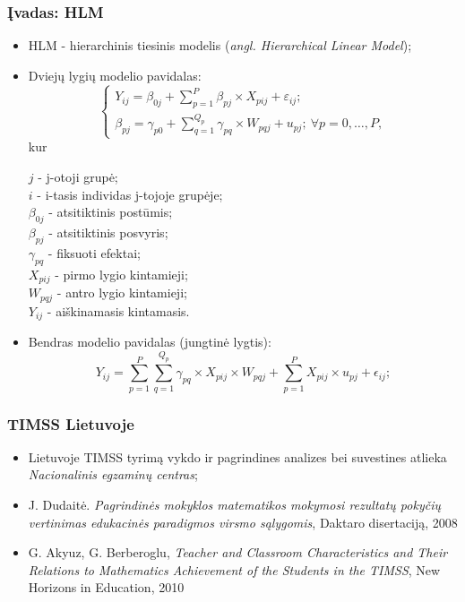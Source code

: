 \documentclass[utf8,hyperref={unicode,pdftex}]{beamer}
\begin{document}
\begin{frame}
\frametitle{Įvadas: HLM}
\begin{itemize}
\item HLM - hierarchinis tiesinis modelis (\textit{angl. Hierarchical Linear Model});
\item Dviejų lygių modelio pavidalas: 
\[ \left\{
  \begin{array}{l}
    Y_{ij} = \beta_{0j}+\sum^P_{p = 1} \beta_{pj}\times X_{pij}+\varepsilon_{ij}; \\
    \beta_{pj} = \gamma_{p0} + \sum^{Q_p}_{q=1}\gamma_{pq}\times W_{pqj}+u_{pj};\ \forall p = 0 , \dots, P,
  \end{array} \right.\]
kur\\
\begin{small}
$j$ - j-otoji grupė;\\
$i$ - i-tasis individas j-tojoje grupėje;\\
$\beta_{0j}$ - atsitiktinis postūmis;\\
$\beta_{pj}$ - atsitiktinis posvyris;\\
$\gamma_{pq}$ - fiksuoti efektai;\\
$X_{pij}$ - pirmo lygio kintamieji;\\
$W_{pqj}$ - antro lygio kintamieji;\\
$Y_{ij}$ - aiškinamasis kintamasis.
\end{small}
\small
\item Bendras modelio pavidalas (jungtinė lygtis):
\[ 
    Y_{ij} =\sum^P_{p = 1} \sum^{Q_p}_{q=1}\gamma_{pq}\times X_{pij}\times W_{pqj}+\sum^P_{p = 1} X_{pij}\times u_{pj}+\epsilon_{ij}; 
 \]
\end{itemize}
\end{frame}

\begin{frame}
\frametitle{TIMSS Lietuvoje}
\begin{itemize}
\item Lietuvoje TIMSS tyrimą vykdo ir pagrindines analizes bei suvestines atlieka \textit{Nacionalinis egzaminų centras};
\item J. Dudaitė. \textit{Pagrindinės mokyklos matematikos mokymosi rezultatų pokyčių vertinimas edukacinės paradigmos virsmo sąlygomis}, Daktaro disertaciją, 2008
\item G. Akyuz, G. Berberoglu, \textit{Teacher and Classroom Characteristics and Their Relations to Mathematics Achievement of the Students in the TIMSS}, New Horizons in Education, 2010
\end{itemize}
\end{frame}
\end{document}

